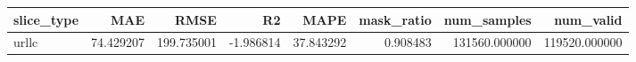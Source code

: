 \begin{tabular}{lrrrrrrr}
\toprule
slice_type & MAE & RMSE & R2 & MAPE & mask_ratio & num_samples & num_valid \\
\midrule
urllc & 74.429207 & 199.735001 & -1.986814 & 37.843292 & 0.908483 & 131560.000000 & 119520.000000 \\
\bottomrule
\end{tabular}
